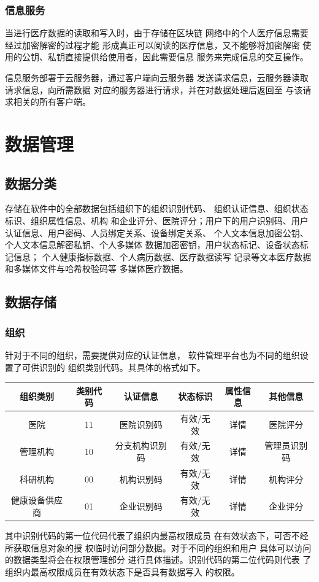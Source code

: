 \documentclass[UTF8]{ctexart}
\begin{document}
    \subsubsection{信息服务}
    \par
    当进行医疗数据的读取和写入时，由于存储在区块链
    网络中的个人医疗信息需要经过加密解密的过程才能
    形成真正可以阅读的医疗信息，又不能够将加密解密
    使用的公钥、私钥直接提供给使用者，因此需要信息
    服务来完成信息的交互操作。
    \par
    信息服务部署于云服务器，通过客户端向云服务器
    发送请求信息，云服务器读取请求信息，向所需数据
    对应的服务器进行请求，并在对数据处理后返回至
    与该请求相关的所有客户端。

    \section{数据管理}
    \subsection{数据分类}
    存储在软件中的全部数据包括组织下的组织识别代码、
    组织认证信息、组织状态标识、组织属性信息、机构
    和企业评分、医院评分；用户下的用户识别码、用户
    认证信息、用户密码、人员绑定关系、设备绑定关系、
    个人文本信息加密公钥、个人文本信息解密私钥、个人多媒体
    数据加密密钥，用户状态标记、设备状态标记信息；
    个人健康指标数据、个人病历数据、医疗数据读写
    记录等文本医疗数据和多媒体文件与哈希校验码等
    多媒体医疗数据。
    \subsection{数据存储}
    \subsubsection{组织}
    针对于不同的组织，需要提供对应的认证信息，
    软件管理平台也为不同的组织设置了可供识别的
    组织类别代码。其具体的格式如下。
    \begin{center}
    \begin{tabular}{cccccc}
        \hline
        组织类别& 类别代码& 认证信息& 状态标识& 属性信息& 其他信息\\
        \hline
        医院& 11& 医院识别码& 有效/无效& 详情& 医院评分\\
        管理机构& 10& 分支机构识别码& 有效/无效& 详情& 管理员识别码\\
        科研机构& 00& 机构识别码& 有效/无效& 详情& 机构评分\\
        健康设备供应商& 01& 企业识别码& 有效/无效& 详情& 企业评分\\
        \hline
    \end{tabular}
    \end{center}
    \par
    其中识别代码的第一位代码代表了组织内最高权限成员
    在有效状态下，可否不经所获取信息对象的授
    权临时访问部分数据。对于不同的组织和用户
    具体可以访问的数据类型将会在权限管理部分
    进行具体描述。识别代码的第二位代码则代表
    了组织内最高权限成员在有效状态下是否具有数据写入
    的权限。
\end{document}
